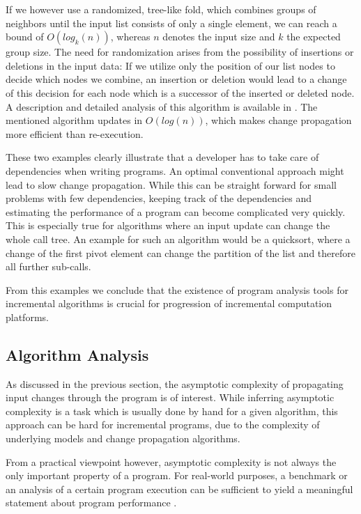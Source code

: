 If we however use a randomized, tree-like fold, which combines groups of neighbors until the input list consists of only a single element, we can reach a bound of $O(log_k(n))$, whereas $n$ denotes the input size and $k$ the expected group size. 
The need for randomization arises from the possibility of insertions or deletions in the input data: If we utilize only the position of our list nodes to decide which nodes we combine, an insertion or deletion would lead to a change of this decision for each node which is a successor of the inserted or deleted node. A description and detailed analysis of this algorithm is available in \cite{Acar2005thesis}. The mentioned algorithm updates in $O(log(n))$, which makes change propagation more efficient than re-execution. 

These two examples clearly illustrate that a developer has to take care of dependencies when writing programs. An optimal conventional approach might lead to slow change propagation. While this can be straight forward for small problems with few dependencies, keeping track of the dependencies and estimating the performance of a program can become complicated very quickly. This is especially true for algorithms where an input update can change the whole call tree. An example for such an algorithm would be a quicksort\cite{hoare1962quicksort}, where a change of the first pivot element can change the partition of the list and therefore all further sub-calls. 

From this examples we conclude that the existence of program analysis tools for incremental algorithms is crucial for progression of incremental computation platforms. 

\subsection{Algorithm Analysis}

As discussed in the previous section, the asymptotic complexity of propagating input changes through the program is of interest. While inferring asymptotic complexity is a task which is usually done by hand for a given algorithm, this approach can be hard for incremental programs, due to the complexity of underlying models and change propagation algorithms. 

From a practical viewpoint however, asymptotic complexity is not always the only important property of a program. For real-world purposes, a benchmark or an analysis of a certain program execution can be sufficient to yield a meaningful statement about program performance \cite{vokolos1998performance}.

